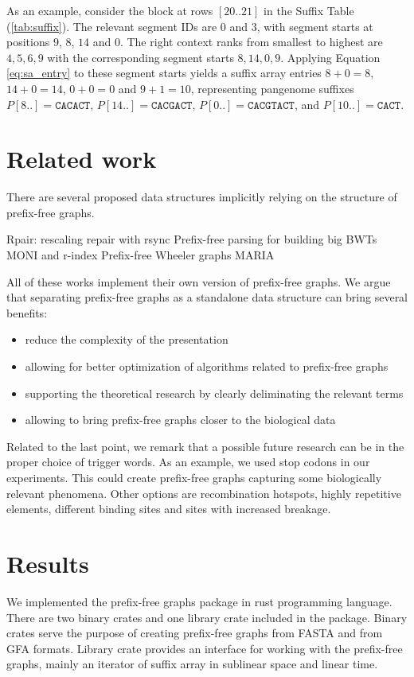 \documentclass[twocolumn]{ceurart}
\begin{document}
As an example, consider the block at rows $[20..21]$ in the Suffix Table (\ref{tab:suffix}).
The relevant segment IDs are $0$ and $3$, with segment starts at positions $9$, $8$, $14$ and $0$.
The right context ranks from smallest to highest are $4, 5, 6, 9$ with the corresponding segment starts $8, 14, 0, 9$.
Applying Equation \ref{eq:sa_entry} to these segment starts yields a suffix array entries $8 + 0 = 8$, $14 + 0 = 14$, $0 + 0 = 0$ and $9 + 1 = 10$, representing pangenome suffixes $P[8..] = \texttt{CACACT}$, $P[14..] = \texttt{CACGACT}$, $P[0..] = \texttt{CACGTACT}$, and $P[10..] = \texttt{CACT}$.

\section{Related work}
There are several proposed data structures implicitly relying on the structure
of prefix-free graphs.

Rpair: rescaling repair with rsync \cite{2019gagie}
Prefix-free parsing for building big BWTs \cite{2019boucher}
MONI and r-index \cite{rossi2022moni,gagie2020fully}
Prefix-free Wheeler graphs \cite{2022pfwg}
MARIA \cite{2022maria}

All of these works implement their own version of prefix-free graphs.
We argue that separating prefix-free graphs as a standalone data structure can
bring several benefits:

\begin{itemize}
    \item reduce the complexity of the presentation
    \item allowing for better optimization of algorithms related to prefix-free graphs
    \item supporting the theoretical research by clearly deliminating the relevant terms
    \item allowing to bring prefix-free graphs closer to the biological data
\end{itemize}

Related to the last point, we remark that a possible future research can be in
the proper choice of trigger words.
As an example, we used stop codons in our experiments.
This could create prefix-free graphs capturing some biologically relevant phenomena.
Other options are recombination hotspots, highly repetitive elements, different
binding sites and sites with increased breakage.

\section{Results}
We implemented the prefix-free graphs package in rust programming language.
There are two binary crates and one library crate included in the package.
Binary crates serve the purpose of creating prefix-free graphs from FASTA and from GFA formats.
Library crate provides an interface for working with the prefix-free graphs,
mainly an iterator of suffix array in sublinear space and linear time.
\end{document}
